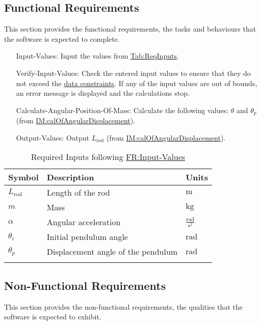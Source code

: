 \documentclass[12pt]{article}
\begin{document}
\subsection{Functional Requirements}
\label{Sec:FRs}
This section provides the functional requirements, the tasks and behaviours that the software is expected to complete.

\begin{itemize}
\item[Input-Values:\phantomsection\label{inputValues}]{Input the values from \hyperref[Table:ReqInputs]{Tab:ReqInputs}.}
\item[Verify-Input-Values:\phantomsection\label{verifyInptVals}]{Check the entered input values to ensure that they do not exceed the \hyperref[Sec:DataConstraints]{data constraints}. If any of the input values are out of bounds, an error message is displayed and the calculations stop.}
\item[Calculate-Angular-Position-Of-Mass:\phantomsection\label{calcAngPos}]{Calculate the following values: $θ$ and ${θ_{p}}$ (from \hyperref[IM:calOfAngularDisplacement]{IM:calOfAngularDisplacement}).}
\item[Output-Values:\phantomsection\label{outputValues}]{Output ${L_{\text{rod}}}$ (from \hyperref[IM:calOfAngularDisplacement]{IM:calOfAngularDisplacement}).}
\end{itemize}
\begin{longtable}{l l l}
\toprule
\textbf{Symbol} & \textbf{Description} & \textbf{Units}
\\
\midrule
\endhead
${L_{\text{rod}}}$ & Length of the rod & ${\text{m}}$
\\
$m$ & Mass & ${\text{kg}}$
\\
$α$ & Angular acceleration & $\frac{\text{rad}}{\text{s}^{2}}$
\\
${θ_{i}}$ & Initial pendulum angle & ${\text{rad}}$
\\
${θ_{p}}$ & Displacement angle of the pendulum & ${\text{rad}}$
\\
\bottomrule
\caption{Required Inputs following \hyperref[inputValues]{FR:Input-Values}}
\label{Table:ReqInputs}
\end{longtable}
\subsection{Non-Functional Requirements}
\label{Sec:NFRs}
This section provides the non-functional requirements, the qualities that the software is expected to exhibit.
\end{document}
